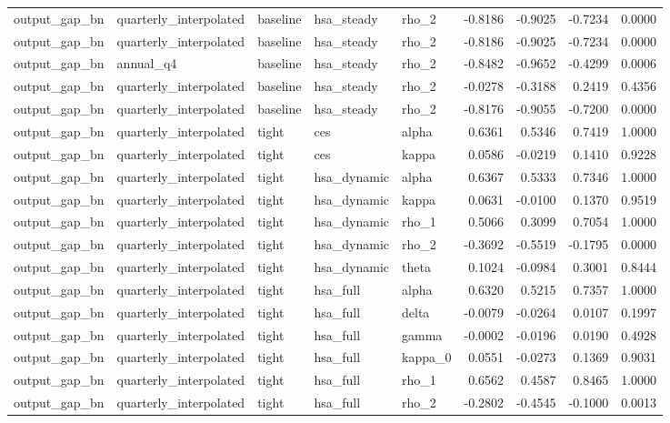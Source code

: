 \begin{tabular}{lllllrrrr}
output\_gap\_bn & quarterly\_interpolated & baseline & hsa\_steady & rho\_2 & -0.8186 & -0.9025 & -0.7234 & 0.0000 \\
output\_gap\_bn & quarterly\_interpolated & baseline & hsa\_steady & rho\_2 & -0.8186 & -0.9025 & -0.7234 & 0.0000 \\
output\_gap\_bn & annual\_q4 & baseline & hsa\_steady & rho\_2 & -0.8482 & -0.9652 & -0.4299 & 0.0006 \\
output\_gap\_bn & quarterly\_interpolated & baseline & hsa\_steady & rho\_2 & -0.0278 & -0.3188 & 0.2419 & 0.4356 \\
output\_gap\_bn & quarterly\_interpolated & baseline & hsa\_steady & rho\_2 & -0.8176 & -0.9055 & -0.7200 & 0.0000 \\
output\_gap\_bn & quarterly\_interpolated & tight & ces & alpha & 0.6361 & 0.5346 & 0.7419 & 1.0000 \\
output\_gap\_bn & quarterly\_interpolated & tight & ces & kappa & 0.0586 & -0.0219 & 0.1410 & 0.9228 \\
output\_gap\_bn & quarterly\_interpolated & tight & hsa\_dynamic & alpha & 0.6367 & 0.5333 & 0.7346 & 1.0000 \\
output\_gap\_bn & quarterly\_interpolated & tight & hsa\_dynamic & kappa & 0.0631 & -0.0100 & 0.1370 & 0.9519 \\
output\_gap\_bn & quarterly\_interpolated & tight & hsa\_dynamic & rho\_1 & 0.5066 & 0.3099 & 0.7054 & 1.0000 \\
output\_gap\_bn & quarterly\_interpolated & tight & hsa\_dynamic & rho\_2 & -0.3692 & -0.5519 & -0.1795 & 0.0000 \\
output\_gap\_bn & quarterly\_interpolated & tight & hsa\_dynamic & theta & 0.1024 & -0.0984 & 0.3001 & 0.8444 \\
output\_gap\_bn & quarterly\_interpolated & tight & hsa\_full & alpha & 0.6320 & 0.5215 & 0.7357 & 1.0000 \\
output\_gap\_bn & quarterly\_interpolated & tight & hsa\_full & delta & -0.0079 & -0.0264 & 0.0107 & 0.1997 \\
output\_gap\_bn & quarterly\_interpolated & tight & hsa\_full & gamma & -0.0002 & -0.0196 & 0.0190 & 0.4928 \\
output\_gap\_bn & quarterly\_interpolated & tight & hsa\_full & kappa\_0 & 0.0551 & -0.0273 & 0.1369 & 0.9031 \\
output\_gap\_bn & quarterly\_interpolated & tight & hsa\_full & rho\_1 & 0.6562 & 0.4587 & 0.8465 & 1.0000 \\
output\_gap\_bn & quarterly\_interpolated & tight & hsa\_full & rho\_2 & -0.2802 & -0.4545 & -0.1000 & 0.0013 \\

\end{tabular}
